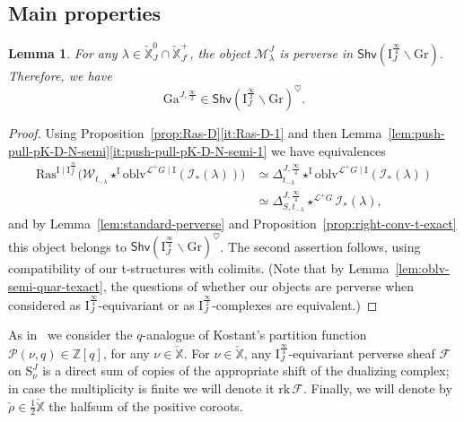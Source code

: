 \documentclass[11pt]{amsart}
\numberwithin{equation}{section}
\theoremstyle{plain}
\newtheorem{lem}[thm]{Lemma}
\theoremstyle{definition}
\newcommand{\sF}{{\mathcal F}}
\newcommand{\I}{{\mathrm I}}
\newcommand{\sI}{{\mathcal I}}
\newcommand{\sL}{{\mathcal L}}
\newcommand{\sM}{{\mathcal M}}
\newcommand{\sP}{{\mathcal P}}
\newcommand{\sW}{{\mathcal W}}
\newcommand{\X}{{\mathbb X}}
\newcommand{\Xd}{\check{\X}}
\newcommand{\Z}{{\mathbb Z}}
\newcommand{\rk}{\mathrm{rk}}
\newcommand{\semi}{{{\frac{\infty}{2}}}}
\newcommand{\quar}{{{\frac{\infty}{4}}}}
\newcommand{\oblv}{\mathrm{oblv}}
\newcommand{\ex}{\mathrm{ext}}
\newcommand{\Shv}{\mathsf{Shv}}
\newcommand{\Ras}{\mathrm{Ras}}
\newcommand{\Gr}{\mathrm{Gr}}
\newcommand{\bs}{\mathbf{s}}
\newcommand{\comp}{\mathrm{c}}
\newcommand{\rS}{\mathfrak{S}}
\newcommand{\Gait}{\mathrm{Ga}}
\begin{document}
\subsection{Main properties}

\begin{lem}
\label{lem:MlambdaJ-perverse}
For any $\lambda\in \Xd^0_J\cap \Xd^+_{J^\comp}$,
the object $\sM^J_\lambda$ is perverse in $\Shv\left( \I^\quar_J \backslash \Gr \right)$. 
Therefore, we have
\[
\Gait^{J,\semi}\in \Shv\left( \I^\semi_J \backslash \Gr \right)^\heartsuit . 
\]
\end{lem}

\begin{proof}
Using Proposition~\ref{prop:Ras-D}\eqref{it:Ras-D-1} and then Lemma~\ref{lem:push-pull-pK-D-N-semi}\eqref{it:push-pull-pK-D-N-semi-1}
we have equivalences 
\begin{align*}
\Ras^{\I\mid \I^\quar_J}\big( \sW_{t_{-\lambda}} \star^\I \oblv^{\sL^+G\mid \I}(\sI_*(\lambda)) \big)
&\simeq \Delta^{J,\quar}_{t_{-\lambda}} \star^\I \oblv^{\sL^+G\mid \I}(\sI_*(\lambda)) \\ 
&\simeq \Delta^{J,\quar}_{S,t_{-\lambda}} \star^{\sL^+G} \sI_*(\lambda),
\end{align*}
and by Lemma~\ref{lem:standard-perverse} and Proposition~\ref{prop:right-conv-t-exact} this object belongs to $\Shv\left( \I^\quar_J \backslash \Gr \right)^\heartsuit$. The second assertion follows, using compatibility of our t-structures with colimits. (Note that by Lemma~\ref{lem:oblv-semi-quar-texact}, the questions of whether our objects are perverse when considered as $\I_J^\quar$-equivariant or as $\I_J^\semi$-complexes are equivalent.)
\end{proof}

As in~\cite[\S 6.7]{adr} we consider
the $q$-analogue of Kostant's partition function $\sP(\nu,q)\in \Z[q]$, for any $\nu\in \Xd$. 
For $\nu\in \Xd$, any $\I^{\quar}_J$-equivariant perverse sheaf $\sF$ on $\mathrm{S}^J_\nu$ is a direct sum of copies of the appropriate shift of the dualizing complex; in case the multiplicity is finite we will denote it $\rk \, \sF$. Finally, we will denote by ${\check \rho} \in \frac{1}{2}\Xd$ the halfsum of the positive coroots.
\end{document}
